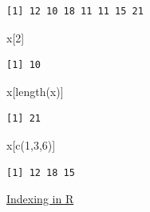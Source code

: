 \documentclass[
  letterpaper,
  DIV=11,
  numbers=noendperiod]{scrreprt}
\newenvironment{Shaded}{\begin{snugshade}}{\end{snugshade}}
\newcommand{\DecValTok}[1]{\textcolor[rgb]{0.68,0.00,0.00}{#1}}
\newcommand{\FunctionTok}[1]{\textcolor[rgb]{0.28,0.35,0.67}{#1}}
\newcommand{\NormalTok}[1]{\textcolor[rgb]{0.00,0.23,0.31}{#1}}
\begin{document}
\begin{verbatim}
[1] 12 10 18 11 11 15 21
\end{verbatim}

\begin{Shaded}
\begin{Highlighting}[]
\NormalTok{x[}\DecValTok{2}\NormalTok{]}
\end{Highlighting}
\end{Shaded}

\begin{verbatim}
[1] 10
\end{verbatim}

\begin{Shaded}
\begin{Highlighting}[]
\NormalTok{x[}\FunctionTok{length}\NormalTok{(x)]}
\end{Highlighting}
\end{Shaded}

\begin{verbatim}
[1] 21
\end{verbatim}

\begin{Shaded}
\begin{Highlighting}[]
\NormalTok{x[}\FunctionTok{c}\NormalTok{(}\DecValTok{1}\NormalTok{,}\DecValTok{3}\NormalTok{,}\DecValTok{6}\NormalTok{)]}
\end{Highlighting}
\end{Shaded}

\begin{verbatim}
[1] 12 18 15
\end{verbatim}

\begin{watch}{}{}
    \href{https://youtu.be/isTXaMdsyfI}{Indexing in R}
\end{watch}
\end{document}
